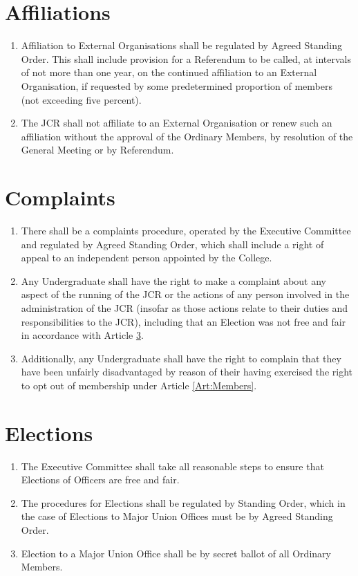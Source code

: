 \documentclass[11pt,a4paper, oneside]{memoir}
\begin{document}
	\section{Affiliations} \label{Art:Affiliations}
	\begin{enumerate}
		\item Affiliation to External Organisations shall be regulated by Agreed Standing Order.  This shall include provision for a Referendum to be called, at intervals of not more than one year, on the continued affiliation to an External Organisation, if requested by some predetermined proportion of members (not exceeding five percent).
		\item The JCR shall not affiliate to an External Organisation or renew such an affiliation without the approval of the Ordinary Members, by resolution of the General Meeting or by Referendum.
	\end{enumerate}
	\section{Complaints} \label{Art:Complaints}
	\begin{enumerate}
		\item There shall be a complaints procedure, operated by the Executive Committee and regulated by Agreed Standing Order, which shall include a right of appeal to an independent person appointed by the College.
		\item Any Undergraduate shall have the right to make a complaint about any aspect of the running of the JCR or the actions of any person involved in the administration of the JCR (insofar as those actions relate to their duties and responsibilities to the JCR), including that an Election was not free and fair in accordance with Article \ref{Art:Elections}.
		\item Additionally, any Undergraduate shall have the right to complain that they have been unfairly disadvantaged by reason of their having exercised the right to opt out of membership under Article \ref{Art:Members}.
	\end{enumerate}
	\section{Elections} \label{Art:Elections}
	\begin{enumerate}
		\item The Executive Committee shall take all reasonable steps to ensure that Elections of Officers are free and fair.
		\item The procedures for Elections shall be regulated by Standing Order, which in the case of Elections to Major Union Offices must be by Agreed Standing Order.
		\item Election to a Major Union Office shall be by secret ballot of all Ordinary Members.
	\end{enumerate}
\end{document}
